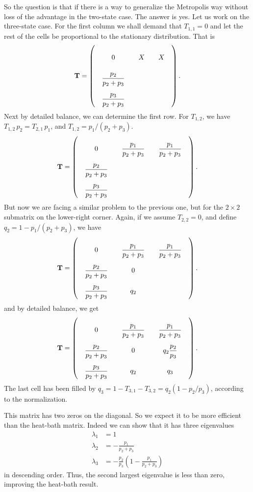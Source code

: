 \documentclass[12pt]{article}
\begin{document}
So the question is that if there is a way to generalize
the Metropolis way without loss of the advantage in the two-state case.
%
The answer is yes.
%
Let us work on the three-state case.
%
For the first column we shall demand that $T_{1,1} = 0$
and let the rest of the cells be proportional to
the stationary distribution. That is
$$
\mathbf T =
\left(
  \arraycolsep=10.0pt\def\arraystretch{2.5}
  \begin{array}{cccccc}
    0   &  X & X \\
    \dfrac{p_2}{p_2+p_3} &  & \\
    \dfrac{p_3}{p_2+p_3} &  &
  \end{array}
\right).
$$
Next by detailed balance, we can determine the first row.
For $T_{1,2}$,
we have $T_{1,2} \, p_2 = T_{2,1} \, p_1$,
and $T_{1,2} = p_1/(p_2 + p_3)$.
$$
\mathbf T =
\left(
  \arraycolsep=10.0pt\def\arraystretch{2.5}
  \begin{array}{cccccc}
    0   &  \dfrac{p_1}{p_2+p_3} & \dfrac{p_1}{p_2+p_3} \\
    \dfrac{p_2}{p_2+p_3} &  & \\
    \dfrac{p_3}{p_2+p_3} &  &
  \end{array}
\right).
$$
But now we are facing a similar problem to the previous one,
but for the $2\times 2$ submatrix on the lower-right corner.
Again, if we assume $T_{2,2} = 0$, and define $q_2 = 1- p_1/(p_2 + p_3)$,
we have
$$
\mathbf T =
\left(
  \arraycolsep=10.0pt\def\arraystretch{2.5}
  \begin{array}{cccccc}
    0   &  \dfrac{p_1}{p_2+p_3} & \dfrac{p_1}{p_2+p_3} \\
    \dfrac{p_2}{p_2+p_3} &  0 & \\
    \dfrac{p_3}{p_2+p_3} &  q_2 &
  \end{array}
\right).
$$
and by detailed balance, we get
$$
\mathbf T =
\left(
  \arraycolsep=10.0pt\def\arraystretch{2.5}
  \begin{array}{cccccc}
    0   &  \dfrac{p_1}{p_2+p_3} & \dfrac{p_1}{p_2+p_3} \\
    \dfrac{p_2}{p_2+p_3} &  0 & q_2 \dfrac{p_2}{p_3} \\
    \dfrac{p_3}{p_2+p_3} &  q_2 & q_3
  \end{array}
\right).
$$
The last cell has been filled by $q_3 = 1 - T_{3,1} - T_{3,2} = q_2 (1 - p_2/p_3)$,
according to the normalization.

This matrix has two zeros on the diagonal.
So we expect it to be more efficient than the heat-bath matrix.
Indeed we can show that it has three eigenvalues
\begin{equation}
\begin{aligned}
  \lambda_1 &= 1 \\
  \lambda_2 &= -\frac{p_1}{p_2+p_3} \\
  \lambda_3 &= -\frac{p_2}{p_3}\left( 1 - \frac{p_1}{p_2+p_3} \right)
\end{aligned}
\label{eq:lambda_dbimproved}
\end{equation}
in descending order.
Thus, the second largest eigenvalue is less than zero,
improving the heat-bath result.
\end{document}
